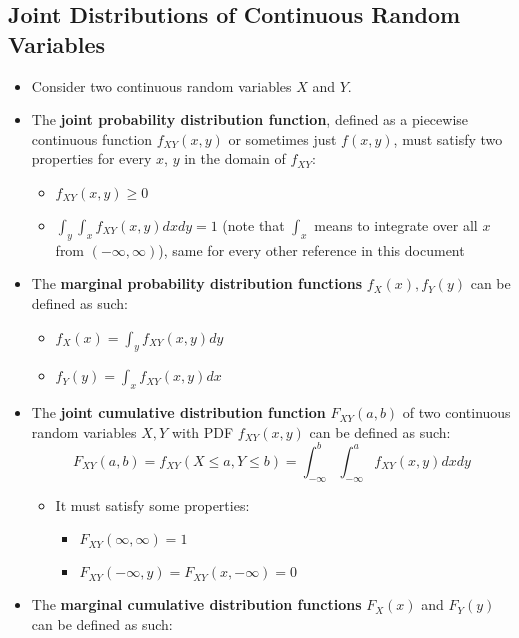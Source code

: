 \documentclass[12pt]{article}
\begin{document}
\subsection{Joint Distributions of Continuous Random Variables}

\begin{itemize}
	\item Consider two continuous random variables $X$ and $Y$.
	\item The \textbf{joint probability distribution function}, defined as a piecewise
	      continuous function $f_{XY}(x, y)$ or sometimes just $f(x, y)$, must satisfy two properties for
	      every $x$, $y$ in the domain of $f_{XY}$:
	      \begin{itemize}
		      \item $f_{XY}(x, y) \geq 0$
		      \item $\int_{y} \int_{x} f_{XY}(x, y) dx dy = 1$ (note that $\int_{x}$
		            means to integrate over all $x$ from $(-\infty, \infty)$),
		            same for every other reference in this document
	      \end{itemize}
	\item The \textbf{marginal probability distribution functions} $f_X(x), f_Y(y)$ can be defined as such:
	      \begin{itemize}
		      \item $f_X(x) = \int_{y} f_{XY}(x, y)dy$
		      \item $f_Y(y) = \int_{x} f_{XY}(x, y)dx$
	      \end{itemize}
	\item The \textbf{joint cumulative distribution function} $F_{XY}(a, b)$ of
	      two continuous random variables $X, Y$ with PDF $f_{XY}(x, y)$ can be defined as such:
	      \[
		      F_{XY}(a, b) = f_{XY}(X \leq a, Y \leq b) = \int_{-\infty}^{b} \int_{-\infty}^{a} f_{XY}(x, y) dx dy
	      \]
	      \begin{itemize}
		      \item It must satisfy some properties:
		            \begin{itemize}
			            \item $F_{XY}(\infty, \infty) = 1$
			            \item $F_{XY}(-\infty, y) = F_{XY}(x, -\infty) = 0$
		            \end{itemize}
	      \end{itemize}
	\item The \textbf{marginal cumulative distribution functions} $F_X(x)$ and $F_Y(y)$ can be defined as such:

\end{itemize}
\end{document}
